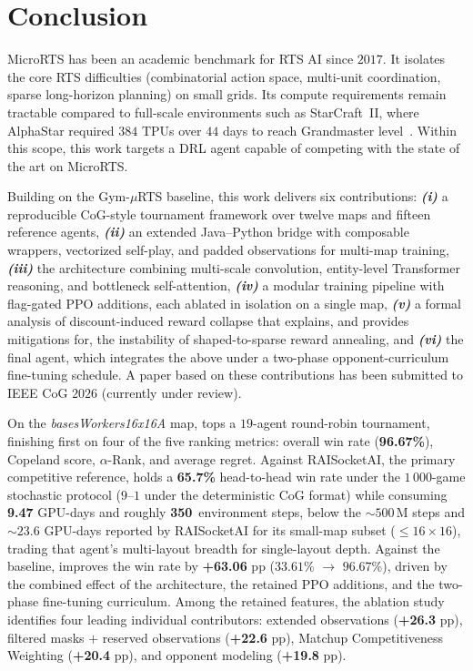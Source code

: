 \chapter{Conclusion}
\label{chap:conclusion}

MicroRTS has been an academic benchmark for RTS AI since $2017$. It isolates the core RTS difficulties (combinatorial action space, multi-unit coordination, sparse long-horizon planning) on small grids. Its compute requirements remain tractable compared to full-scale environments such as StarCraft~II, where AlphaStar required $384$ TPUs over $44$ days to reach Grandmaster level~\cite{vinyalsGrandmasterLevelStarCraft2019}. Within this scope, this work targets a DRL agent capable of competing with the state of the art on MicroRTS.

\medskip

Building on the Gym-$\mu$RTS baseline, this work delivers six contributions: \textbf{\emph{(i)}} a reproducible CoG-style tournament framework over twelve maps and fifteen reference agents, \textbf{\emph{(ii)}} an extended Java--Python bridge with composable wrappers, vectorized self-play, and padded observations for multi-map training, \textbf{\emph{(iii)}} the  architecture combining multi-scale convolution, entity-level Transformer reasoning, and bottleneck self-attention, \textbf{\emph{(iv)}} a modular training pipeline with flag-gated PPO additions, each ablated in isolation on a single map, \textbf{\emph{(v)}} a formal analysis of discount-induced reward collapse that explains, and provides mitigations for, the instability of shaped-to-sparse reward annealing, and \textbf{\emph{(vi)}} the final  agent, which integrates the above under a two-phase opponent-curriculum fine-tuning schedule. A paper based on these contributions has been submitted to IEEE CoG $2026$ (currently under review).
  
\medskip

On the \emph{basesWorkers16x16A} map,  tops a $19$-agent round-robin tournament, finishing first on four of the five ranking metrics: overall win rate (\textbf{96.67\%}), Copeland score, $\alpha$-Rank, and average regret. Against RAISocketAI, the primary competitive reference,  holds a \textbf{65.7\%} head-to-head win rate under the $1\,000$-game stochastic protocol ($9$--$1$ under the deterministic CoG format) while consuming \textbf{9.47} GPU-days and roughly \textbf{350\,} environment steps, below the ${\sim}500\,\text{M}$ steps and ${\sim}23.6$ GPU-days reported by RAISocketAI for its small-map subset ($\le 16{\times}16$), trading that agent's multi-layout breadth for single-layout depth. Against the  baseline,  improves the win rate by \textbf{+63.06} pp ($33.61$\% $\to$ $96.67$\%), driven by the combined effect of the  architecture, the retained PPO additions, and the two-phase fine-tuning curriculum. Among the retained features, the ablation study identifies four leading individual contributors: extended observations (\textbf{+26.3} pp), filtered masks $+$ reserved observations (\textbf{+22.6} pp), Matchup Competitiveness Weighting (\textbf{+20.4} pp), and opponent modeling (\textbf{+19.8} pp).


